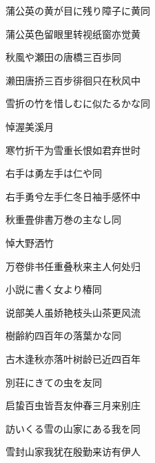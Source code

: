 \begin{haiku}
    {\FH 蒲公英の黄が目に残り障子に黄}\hfill{\FH 同}

    {\FK 蒲公英色留眼里转视纸窗亦觉黄}
\end{haiku}

\begin{haiku}
    {\FH 秋風や瀬田の唐橋三百歩}\hfill{\FH 同}

    {\FK 濑田唐挢三百步徘徊只在秋风中}
\end{haiku}

\begin{haiku}
    {\FH 雪折の竹を惜しむに似たるかな}\hfill{\FH 同}

    {\FK 悼渥美溪月}

    {\FK 寒竹折干为雪重长恨如君弃世时}
\end{haiku}

\begin{haiku}
    {\FH 右手は勇左手は仁や}\hfill{\FH 同}

    {\FK 右手勇兮左手仁冬日袖手感怀中}
\end{haiku}

\begin{haiku}
    {\FH 秋重畳俳書万巻の主なし}\hfill{\FH 同}

    {\FK 悼大野洒竹}

    {\FK 万卷俳书任重叠秋来主人何处归}
\end{haiku}

\begin{haiku}
    {\FH 小説に書く女より椿}\hfill{\FH 同}

    {\FK 说部美人虽娇艳枝头山茶更风流}
\end{haiku}

\begin{haiku}
    {\FH 樹齢約四百年の落葉かな}\hfill{\FH 同}

    {\FK 古木逢秋亦落叶树龄已近四百年}
\end{haiku}

\begin{haiku}
    {\FH 別荘にきての虫を友}\hfill{\FH 同}

    {\FK 启蛰百虫皆吾友仲春三月来别庄}
\end{haiku}

\begin{haiku}
    {\FH 訪いくる雪の山家にある我を}\hfill{\FH 同}

    {\FK 雪封山家我犹在殷勤来访有伊人}
\end{haiku}

